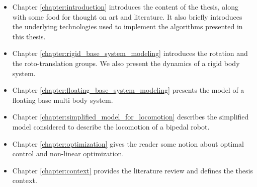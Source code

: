 \begin{itemize}
    \item Chapter \ref{chapter:introduction} introduces the content of the thesis, along with some food for thought on art and literature.
    It also briefly introduces the underlying technologies used to implement the algorithms presented in this thesis.
    \item Chapter \ref{chapter:rigid_base_system_modeling} introduces the rotation and the roto-translation groups. We also present the dynamics of a rigid body system.
    \item Chapter \ref{chapter:floating_base_system_modeling} presents the model of a floating base multi body system.
    \item Chapter \ref{chapter:simplified_model_for_locomotion} describes the simplified model considered to describe the locomotion of a bipedal robot.
    \item Chapter \ref{chapter:optimization} gives the reader some notion about optimal control and non-linear optimization.
    \item Chapter \ref{chapter:context} provides the literature review  and defines the thesis context.
\end{itemize}


